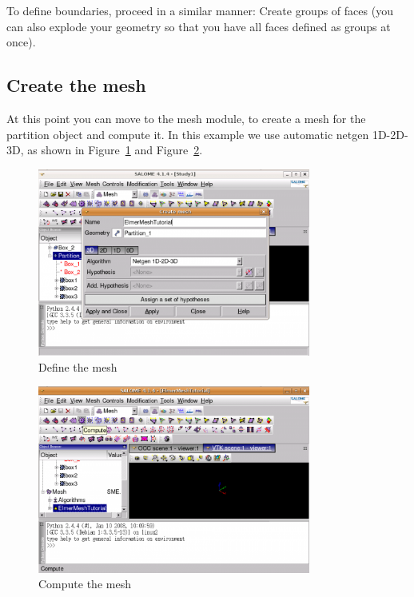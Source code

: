 To define boundaries, proceed in a similar manner: Create groups of faces (you can also explode your geometry so that you have all faces defined as groups at once).

\subsection{Create the mesh}

At this point you can move to the mesh module, to create a mesh for the partition object and compute it. In this example we use automatic netgen 1D-2D-3D, as shown in Figure~\ref{fg:salome-5} and Figure~\ref{fg:salome-6}.

\begin{figure}[H]
\centering
\includegraphics[width=0.8\textwidth]{Salome-5-createmesh}
\caption{Define the mesh}\label{fg:salome-5}
\end{figure}

\begin{figure}[H]
\centering
\includegraphics[width=0.8\textwidth]{Salome-6-computemesh}
\caption{Compute the mesh}\label{fg:salome-6}
\end{figure}

